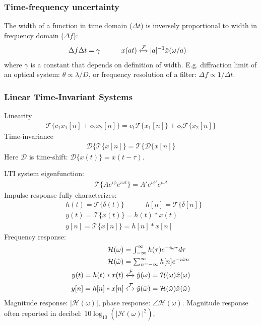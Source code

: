 \documentclass[6pt,landscape,a4paper]{article}
\begin{document}
\begin{multicols*}{5}
\subsubsection*{Time-frequency uncertainty}
The width of a function in time domain ($\Delta t$) is inversely proportional to width in frequency domain ($\Delta f$):
\vspace{-0.5em}
\begin{align*}
&\Delta f \Delta t = \gamma  \hspace{3em} x(at) \xleftrightarrow{\mathcal{F}} |a|^{-1}\hat{x}(\omega/a)
\end{align*}
where $\gamma$ is a constant that depends on definition of width. E.g. diffraction limit of an optical system: $\theta \propto \lambda/D$, or frequency resolution of a filter: $\Delta f \propto 1/\Delta t$.
\subsubsection*{Linear Time-Invariant Systems}
Linearity
\begin{align*}
\mathcal{T}\{ c_1 x_1[n] + c_2 x_2[n]\}=c_1\mathcal{T}\{ x_1[n] \} + c_2 \mathcal{T}\{ x_2[n] \}
\end{align*}
Time-invariance
\begin{align*}
\mathcal{D}\{\mathcal{T}\{ x[n] \} = \mathcal{T}\{\mathcal{D}\{ x[n] \} 
\end{align*}
Here $\mathcal{D}$ is time-shift: $\mathcal{D}\{x(t)\}=x(t-\tau)$.

LTI system eigenfunction: 
\begin{align*}
\mathcal{T}\{A e^{i\phi} e^{i\omega t}\}=A' e^{i\phi'}e^{i\omega t}
\end{align*}
Impulse response fully characterizes:
\begin{align*}
&h(t) = \mathcal{T}\{\delta(t)\} \hspace{3em} h[n]  = \mathcal{T}\{\delta[n]\} \\
&y(t) = \mathcal{T}\{x(t)\} = h(t)*x(t) \\
&y[n]  = \mathcal{T}\{x[n]\} = h[n]*x[n]
\end{align*}
Frequency response:
\begin{align*}
  \mathcal{H}(\omega) &= \textstyle\int_{-\infty}^{\infty} h(\tau) e^{-i \omega \tau} d\tau \\
    \mathcal{H}(\hat{\omega}) &= \textstyle\sum_{n=-\infty}^{\infty} h[n] e^{-i \hat{\omega} n} \\
        y(t) = h(t)*x(t) &\xleftrightarrow{\mathcal{F}} \hat{y}(\omega)=\mathcal{H}(\omega)\hat{x}(\omega) \\
     y[n] = h[n]*x[n] &\xleftrightarrow{\mathcal{F}} \hat{y}(\hat{\omega})=\mathcal{H}(\hat{\omega})\hat{x}(\hat{\omega}) 
\end{align*}
Magnitude response: $|\mathcal{H}(\omega)|$, phase response: $\angle \mathcal{H}(\omega)$. Magnitude response often reported in decibel: $10\log_{10}(|\mathcal{H}(\omega)|^2)$,


\end{multicols*}
\end{document}
